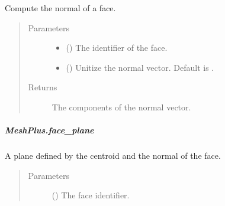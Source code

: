 \documentclass[letterpaper,10pt,english]{sphinxmanual}
\begin{document}
\begin{fulllineitems}
\begin{fulllineitems}
\label{\detokenize{api/generated/directional_clustering.mesh.MeshPlus.face_normal:directional_clustering.mesh.MeshPlus.face_normal}}
Compute the normal of a face.
\begin{quote}\begin{description}
\item[{Parameters}] \leavevmode\begin{itemize}
\item {} 
 () \textendash{} The identifier of the face.

\item {} 
 () \textendash{} Unitize the normal vector.
Default is .

\end{itemize}

\item[{Returns}] \leavevmode
{} \textendash{} The components of the normal vector.

\end{description}\end{quote}

\end{fulllineitems}



\subparagraph{MeshPlus.face\_plane}
\label{\detokenize{api/generated/directional_clustering.mesh.MeshPlus.face_plane:meshplus-face-plane}}\label{\detokenize{api/generated/directional_clustering.mesh.MeshPlus.face_plane::doc}}

\begin{fulllineitems}
\label{\detokenize{api/generated/directional_clustering.mesh.MeshPlus.face_plane:directional_clustering.mesh.MeshPlus.face_plane}}
A plane defined by the centroid and the normal of the face.
\begin{quote}\begin{description}
\item[{Parameters}] \leavevmode
{} () \textendash{} The face identifier.


\end{description}
\end{quote}
\end{fulllineitems}
\end{fulllineitems}
\end{document}
